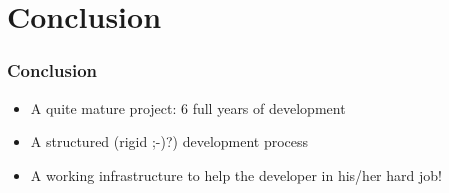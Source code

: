 \documentclass[8pt]{beamer}
\begin{document}
\section[Conclusion]{Conclusion}
\begin{frame}
  \Large
  \frametitle{Conclusion}
  \begin{itemize}
  \item A quite mature project: 6 full years of development
  \item A structured (rigid ;-)?) development process
  \item A working infrastructure to help the developer in his/her hard job!
  \end{itemize}
\end{frame}
\end{document}
